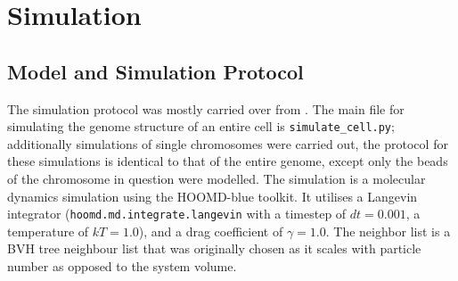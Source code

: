 
\chapter{Simulation} %
\label{cha:simulation}

\section{Model and Simulation Protocol} %
\label{sec:model_and_simulation_protocol}

The simulation protocol was mostly carried over from \cite{wettermann_minimal_2020}. The main file for simulating the genome structure of an entire cell is \verb|simulate_cell.py|; additionally simulations of single chromosomes were carried out, the protocol for these simulations is identical to that of the entire genome, except only the beads of the chromosome in question were modelled. The simulation is a molecular dynamics simulation using the HOOMD-blue\cite{anderson_hoomd-blue_2020} toolkit. It utilises a Langevin integrator (\verb|hoomd.md.integrate.langevin| with a timestep of \(dt=0.001\), a temperature of \(kT = 1.0\)), and a drag coefficient of \(\gamma = 1.0\). The neighbor list is a BVH tree neighbour list \cite{howard_efficient_2016} \cite{howard_quantized_2019} that was originally chosen as it scales
with particle number as opposed to the system volume\cite{wettermann_minimal_2020}.

